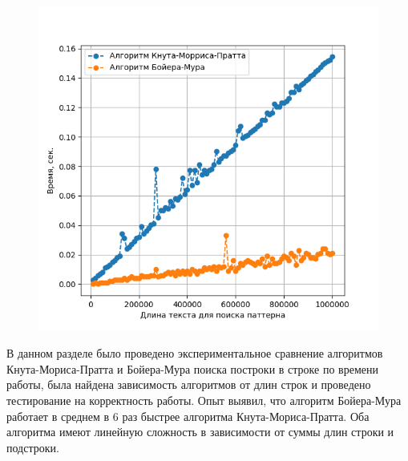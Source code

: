 \documentclass[../main.tex]{subfiles}
\begin{document}
	\begin{figure}[H]
		\centering
		\includegraphics{src/img/bm-kmp-compare}
		\caption{}
		\label{fig:bm-kmp-compare}
	\end{figure}

	В данном разделе было проведено экспериментальное сравнение алгоритмов Кнута-Мориса-Пратта и Бойера-Мура поиска построки в строке по времени работы, была найдена зависимость алгоритмов от длин строк и проведено тестирование на корректность работы. 
	Опыт выявил, что алгоритм Бойера-Мура работает в среднем в 6 раз быстрее алгоритма Кнута-Мориса-Пратта. 
	Оба алгоритма имеют линейную сложность в зависимости от суммы длин строки и подстроки.
	
	
\end{document}
